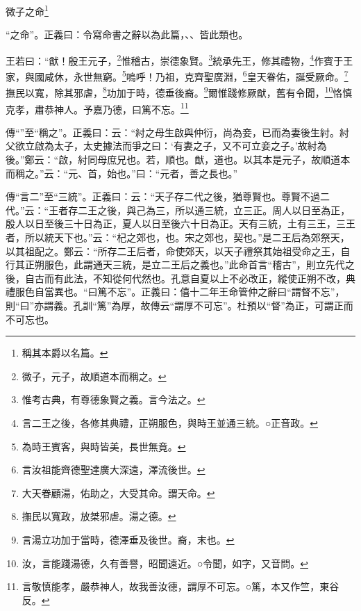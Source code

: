 微子之命\footnote{稱其本爵以名篇。}

{\noindent\shu{}\fzkt “之命”。正義曰：令寫命書之辭以為此篇，、、皆此類也。 \par}

王若曰：“猷！殷王元子，\footnote{微子，元子，故順道本而稱之。}惟稽古，崇德象賢。\footnote{惟考古典，有尊德象賢之義。言今法之。}統承先王，修其禮物，\footnote{言二王之後，各修其典禮，正朔服色，與時王並通三統。○正音政。}作賓于王家，與國咸休，永世無窮。\footnote{為時王賓客，與時皆美，長世無竟。}嗚呼！乃祖，克齊聖廣淵，\footnote{言汝祖能齊德聖達廣大深遠，澤流後世。}皇天眷佑，誕受厥命。\footnote{大天眷顧湯，佑助之，大受其命。謂天命。}撫民以寬，除其邪虐，\footnote{撫民以寬政，放桀邪虐。湯之德。}功加于時，德垂後裔。\footnote{言湯立功加于當時，德澤垂及後世。裔，末也。}爾惟踐修厥猷，舊有令聞，\footnote{汝，言能踐湯德，久有善譽，昭聞遠近。○令聞，如字，又音問。}恪慎克孝，肅恭神人。予嘉乃德，曰篤不忘。\footnote{言敬慎能孝，嚴恭神人，故我善汝德，謂厚不可忘。○篤，本又作竺，東谷反。}


{\noindent\zhuan{}\fzbyks 傳“”至“稱之”。正義曰：云：“紂之母生啟與仲衍，尚為妾，已而為妻後生紂。紂父欲立啟為太子，太史據法而爭之曰：‘有妻之子，又不可立妾之子。’故紂為後。”鄭云：“啟，紂同母庶兄也。若，順也。猷，道也。以其本是元子，故順道本而稱之。”云：“元、首，始也。”曰：“元者，善之長也。” \par}

{\noindent\zhuan{}\fzbyks 傳“言二”至“三統”。正義曰：云：“天子存二代之後，猶尊賢也。尊賢不過二代。”云：“王者存二王之後，與己為三，所以通三統，立三正。周人以日至為正，殷人以日至後三十日為正，夏人以日至後六十日為正。天有三統，土有三王，三王者，所以統天下也。”云：“杞之郊也，也。宋之郊也，契也。”是二王后為郊祭天，以其祖配之。鄭云：“所存二王后者，命使郊天，以天子禮祭其始祖受命之王，自行其正朔服色，此謂通天三統，是立二王后之義也。”此命首言“稽古”，則立先代之後，自古而有此法，不知從何代然也。孔意自夏以上不必改正，縱使正朔不改，典禮服色自當異也。“曰篤不忘”。正義曰：僖十二年王命管仲之辭曰“謂督不忘”，則“曰”亦謂義。孔訓“篤”為厚，故傳云“謂厚不可忘”。杜預以“督”為正，可謂正而不可忘也。 \par}


